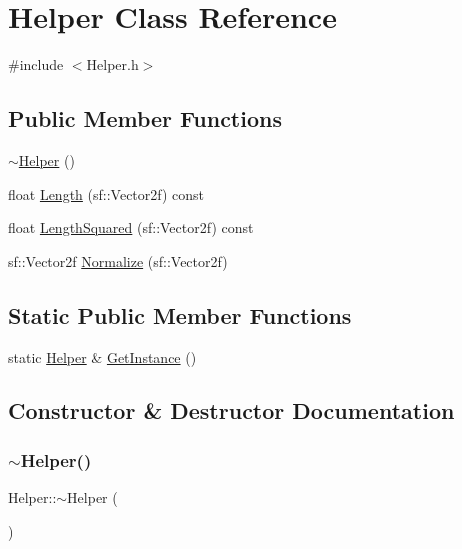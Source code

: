 \hypertarget{class_helper}{}\section{Helper Class Reference}
\label{class_helper}


{\ttfamily \#include $<$Helper.\+h$>$}

\subsection*{Public Member Functions}
\begin{DoxyCompactItemize}
\item 
\hyperlink{class_helper_ad714e92b4bc40bee681e0713503c9b27}{$\sim$\+Helper} ()
\item 
float \hyperlink{class_helper_a0cde798c2e2940f733c0d82062a32994}{Length} (sf\+::\+Vector2f) const
\item 
float \hyperlink{class_helper_a7f7c47be61f23ba30a71119f9dbbf847}{Length\+Squared} (sf\+::\+Vector2f) const
\item 
sf\+::\+Vector2f \hyperlink{class_helper_a7b3164a812d73c432b84e9ea1d2df507}{Normalize} (sf\+::\+Vector2f)
\end{DoxyCompactItemize}
\subsection*{Static Public Member Functions}
\begin{DoxyCompactItemize}
\item 
static \hyperlink{class_helper}{Helper} \& \hyperlink{class_helper_a2efdc8231bed2315ec951558af552f31}{Get\+Instance} ()
\end{DoxyCompactItemize}


\subsection{Constructor \& Destructor Documentation}
\hypertarget{class_helper_ad714e92b4bc40bee681e0713503c9b27}{}\label{class_helper_ad714e92b4bc40bee681e0713503c9b27} 
\subsubsection{\texorpdfstring{$\sim$\+Helper()}{~Helper()}}
{\footnotesize\ttfamily Helper\+::$\sim$\+Helper (\begin{DoxyParamCaption}{ }\end{DoxyParamCaption})}




